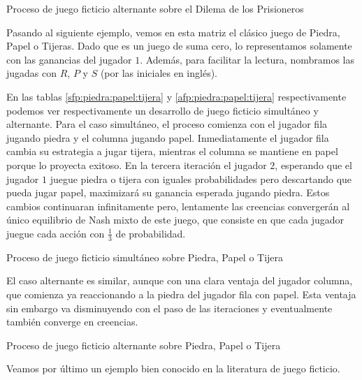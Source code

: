 \begin{table} %
    \centering
    
    \caption{Proceso de juego ficticio alternante sobre el Dilema de los Prisioneros}
    \label{afp:dilema:prisioneros}
\end{table}

Pasando al siguiente ejemplo, vemos en esta matriz el clásico juego de Piedra, Papel o Tijeras. Dado que es un juego de suma cero, lo representamos solamente con las ganancias del jugador $1$. Además, para facilitar la lectura, nombramos las jugadas con $R$, $P$ y $S$ (por las iniciales en inglés).



En las tablas \ref{sfp:piedra:papel:tijera} y \ref{afp:piedra:papel:tijera} respectivamente podemos ver respectivamente un desarrollo de juego ficticio simultáneo y alternante. Para el caso simultáneo, el proceso comienza con el jugador fila jugando piedra y el columna jugando papel. Inmediatamente el jugador fila cambia su estrategia a jugar tijera, mientras el columna se mantiene en papel porque lo proyecta exitoso. En la tercera iteración el jugador $2$, esperando que el jugador $1$ juegue piedra o tijera con iguales probabilidades pero descartando que pueda jugar papel, maximizará su ganancia esperada jugando piedra. Estos cambios continuaran infinitamente pero, lentamente las creencias convergerán al único equilibrio de Nash mixto de este juego, que consiste en que cada jugador juegue cada acción con $\frac{1}{3}$ de probabilidad.

\begin{table} %
    \centering
    
    \caption{Proceso de juego ficticio simultáneo sobre Piedra, Papel o Tijera}
    \label{sfp:piedra:papel:tijera}
\end{table}

El caso alternante es similar, aunque con una clara ventaja del jugador columna, que comienza ya reaccionando a la piedra del jugador fila con papel. Esta ventaja sin embargo va disminuyendo con el paso de las iteraciones y eventualmente también converge en creencias.


\begin{table} %
    \centering
    
    \caption{Proceso de juego ficticio alternante sobre Piedra, Papel o Tijera}
    \label{afp:piedra:papel:tijera}
\end{table}

Veamos por último un ejemplo bien conocido en la literatura de juego ficticio.

